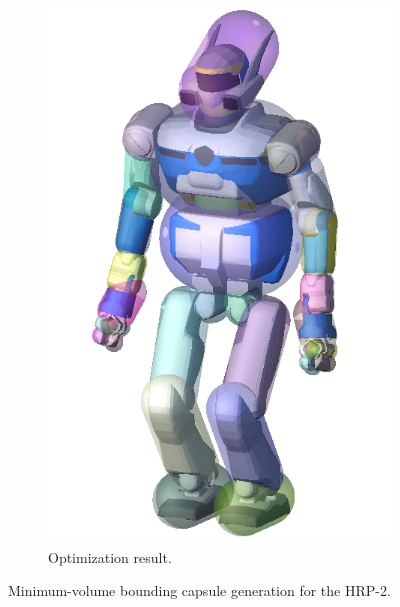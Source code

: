 \begin{figure}
\begin{subfigure}{0.24\columnwidth}
    \includegraphics[width = \columnwidth]
                    {src/chap3-optimal-motion-planning/figure/hrp2-capsule.png}
    \caption{Optimization result.}
    \label{simple-path-sol-shortcuta}
  \end{subfigure}
  \caption{Minimum-volume bounding capsule generation for the HRP-2.}
  \label{fig:chap3-hrp2-capsule}
\end{figure}

